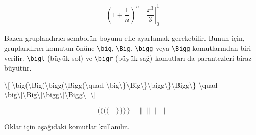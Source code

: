 \documentclass[
  10pt,
]{scrbook}
\newenvironment{Shaded}{\begin{snugshade}}{\end{snugshade}}
\newcommand{\SpecialCharTok}[1]{\textcolor[rgb]{0.00,0.00,0.00}{#1}}
\newcommand{\SpecialStringTok}[1]{\textcolor[rgb]{0.31,0.60,0.02}{#1}}
\theoremstyle{definition}
\theoremstyle{definition}
\theoremstyle{definition}
\theoremstyle{definition}
\theoremstyle{remark}
\begin{document}
\[
\left(1+\frac{1}{n}\right)^n\quad
\left.\frac{x^3}{3}\right|_0^1
\]

Bazen gruplandırıcı sembolün boyunu elle ayarlamak gerekebilir. Bunun için, gruplandırıcı komutun önüne \texttt{\textbackslash{}big}, \texttt{\textbackslash{}Big}, \texttt{\textbackslash{}bigg} veya \texttt{\textbackslash{}Bigg} komutlarından biri verilir. \texttt{\textbackslash{}bigl} (büyük sol) ve \texttt{\textbackslash{}bigr} (büyük sağ) komutları da parantezleri biraz büyütür.

\begin{Shaded}
\begin{Highlighting}[]
\SpecialStringTok{\textbackslash{}[}
\SpecialCharTok{\textbackslash{}big}\SpecialStringTok{(}\SpecialCharTok{\textbackslash{}Big}\SpecialStringTok{(}\SpecialCharTok{\textbackslash{}bigg}\SpecialStringTok{(}\SpecialCharTok{\textbackslash{}Bigg}\SpecialStringTok{(}\SpecialCharTok{\textbackslash{}quad}
\SpecialCharTok{\textbackslash{}big\textbackslash{}\}\textbackslash{}Big\textbackslash{}\}\textbackslash{}bigg\textbackslash{}\}\textbackslash{}Bigg\textbackslash{}\}}
\SpecialCharTok{\textbackslash{}quad}
\SpecialCharTok{\textbackslash{}big\textbackslash{}|\textbackslash{}Big\textbackslash{}|\textbackslash{}bigg\textbackslash{}|\textbackslash{}Bigg\textbackslash{}|}
\SpecialStringTok{\textbackslash{}]}
\end{Highlighting}
\end{Shaded}

\[
\big(\Big(\bigg(\Bigg(\quad
\big\}\Big\}\bigg\}\Bigg\}
\quad
\big\|\Big\|\bigg\|\Bigg\|
\]

Oklar için aşağıdaki komutlar kullanılır.
\end{document}
